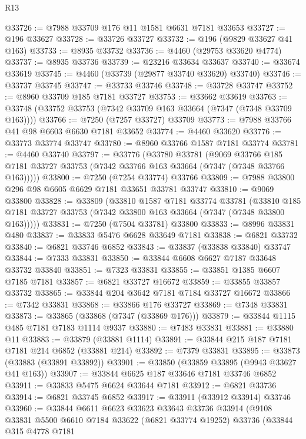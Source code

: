 \begin{lexlean}{R13}
\begin{coremodule}
@33726 := @7988 @33709 @176 @11 @1581 @6631 @7181 @33653
@33727 := @196 @33627
@33728 := @33726 @33727
@33732 := @196 (@9829 @33627 @41 @163)
@33733 := @8935 @33732
@33736 := @4460 (@29753 @33620 @4774)
@33737 := @8935 @33736
@33739 := @23216 @33634 @33637
@33740 := @33674 @33619
@33745 := @4460 (@33739 (@29877 @33740 @33620) @33740)
@33746 := @33737 @33745
@33747 := @33733 @33746
@33748 := @33728 @33747
@33752 := @8960 @33709 @185 @7181 @33727
@33753 := @33662 @33619
@33763 := @33748 (@33752 @33753 (@7342 @33709 @163 @33664 (@7347 (@7348 @33709 @163))))
@33766 := @7250 (@7257 @33727) @33709
@33773 := @7988 @33766 @41 @98 @6603 @6630 @7181 @33652
@33774 := @4460 @33620
@33776 := @33773 @33774 @33747
@33780 := @8960 @33766 @1587 @7181 @33774
@33781 := @4460 @33740
@33797 := @33776
    (@33780
      @33781
      (@9069
        @33766
        @185
        @7181
        @33727
        @33753
        (@7342 @33766 @163 @33664 (@7347 (@7348 @33766 @163)))))
@33800 := @7250 (@7254 @33774) @33766
@33809 := @7988 @33800 @296 @98 @6605 @6629 @7181 @33651 @33781 @33747
@33810 := @9069 @33800
@33828 := @33809
    (@33810
      @1587
      @7181
      @33774
      @33781
      (@33810 @185 @7181 @33727 @33753 (@7342 @33800 @163 @33664 (@7347 (@7348 @33800 @163)))))
@33831 := @7250 (@7504 @33781) @33800
@33833 := @8996 @33831 @480
@33837 := @33833 @5476 @6628 @33649 @7181
@33838 := @6821 @33732
@33840 := @6821 @33746 @6852
@33843 := @33837 (@33838 @33840) @33747
@33844 := @7333 @33831
@33850 := @33844 @6608 @6627 @7187 @33648 @33732 @33840
@33851 := @7323 @33831
@33855 := @33851 @1385 @6607 @7185 @7181
@33857 := @6821 @33727 @16672
@33859 := @33855 @33857 @33732
@33865 := @33844 @204 @3642 @7181 @7184 @33727 @16672
@33866 := @7342 @33831
@33868 := @33866 @176 @33727
@33869 := @7348 @33831
@33873 := @33865 (@33868 (@7347 (@33869 @176)))
@33879 := @33844 @1115 @485 @7181 @7183 @1114 @9337
@33880 := @7483 @33831
@33881 := @33880 @11
@33883 := @33879 (@33881 @1114)
@33891 := @33844 @215 @187 @7181 @7181 @214 @6852 (@33881 @214)
@33892 := @7379 @33831
@33895 := @33873 (@33883 (@33891 @33892))
@33901 := @33850 (@33859 @33895 (@9943 @33627 @41 @163))
@33907 := @33844 @6625 @187 @33646 @7181 @33746 @6852
@33911 := @33833 @5475 @6624 @33644 @7181
@33912 := @6821 @33736
@33914 := @6821 @33745 @6852
@33917 := @33911 (@33912 @33914) @33746
@33960 := @33844
    @6611
    @6623
    @33623
    @33643
    @33736
    @33914
    (@9108
      @33831
      @5500
      @6610
      @7184
      @33622
      (@6821 @33774 @19252)
      @33736
      (@33844
        @315
        @4778
        @7181

\end{coremodule}
\end{lexlean}

